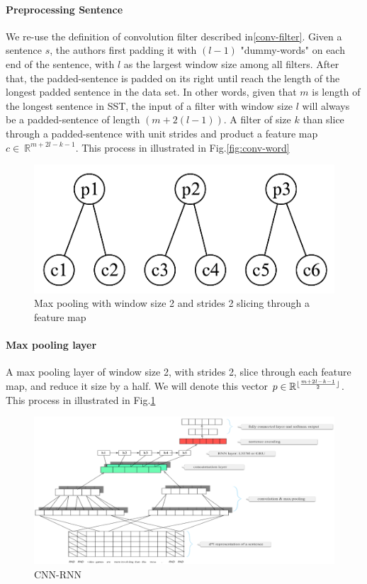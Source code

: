 \paragraph{Preprocessing Sentence} We re-use the definition of convolution filter described in\ref{conv-filter}.
Given a sentence \(s\), the authors first padding it with \((l-1)\) "dummy-words" on each end of the sentence, with \(l\) as the largest window size among all filters.
After that, the padded-sentence is padded on its right until reach the length of the longest padded sentence in the data set.
In other words, given that \(m\) is length of the longest sentence in SST, the input of a filter with window size \(l\) will always be a padded-sentence of length \((m + 2(l-1))\).
A filter of size \(k\) than slice through a padded-sentence with unit strides and product a feature map \(c \in \ \mathbb{R}^{m + 2l - k - 1}\).
This process in illustrated in Fig.\ref{fig:conv-word}

\begin{figure}[H]
	\centering	\includegraphics[scale=0.34]{figure/2-max}
	\caption{Max pooling with window size 2 and strides 2 slicing through a feature map}
	\label{fig:2-max-pooling}
\end{figure}
  
\paragraph{Max pooling layer} A max pooling layer of window size 2, with strides 2, slice through each feature map, and reduce it size by a half.
We will denote this vector \(p \in \mathbb{R}^{\lfloor \frac{m + 2l - k - 1}{2} \rfloor} \). 
This process in illustrated in Fig.\ref{fig:2-max-pooling}   


\begin{figure}[H]
	\raggedleft	\includegraphics[scale=0.425]{figure/cnn-rnn}
	\caption{CNN-RNN}
	\label{fig:cnn-rnn}
\end{figure}

